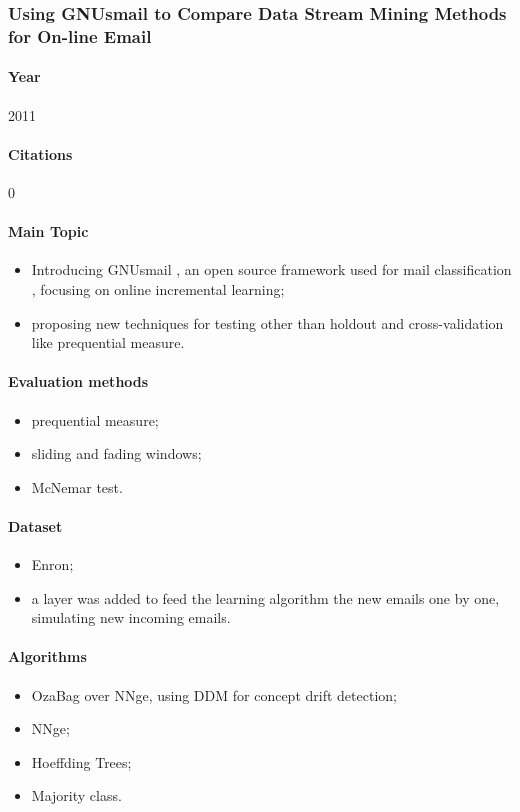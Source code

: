 \documentclass[12pt]{article}
\begin{document}

\subsubsection{Using GNUsmail to Compare Data Stream Mining Methods for On-line Email}
\paragraph{Year} 2011

\paragraph{Citations} 0

\paragraph{Main Topic}
\begin{itemize}
    \item Introducing GNUsmail , an open source framework used for mail classification , focusing on online incremental learning;
    \item proposing new techniques for testing other than holdout and cross-validation like prequential measure.
\end{itemize}

\paragraph{Evaluation methods}
\begin{itemize}
    \item prequential measure;
    \item sliding and fading windows;
    \item McNemar test.
\end{itemize}

\paragraph{Dataset}
\begin{itemize}
    \item Enron;
    \item a layer was added to feed the learning algorithm the new emails one by one, simulating new incoming emails.
\end{itemize}

\paragraph{Algorithms}
\begin{itemize}
    \item OzaBag over NNge, using DDM for concept drift detection;
    \item NNge;
    \item Hoeffding Trees;
    \item Majority class.
\end{itemize}
\end{document}
